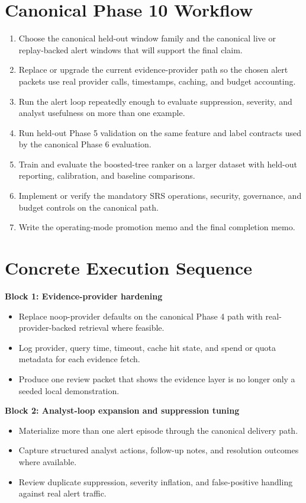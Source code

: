 \documentclass{article}
\begin{document}
\section*{Canonical Phase 10 Workflow}
\begin{enumerate}
\item Choose the canonical held-out window family and the canonical live or replay-backed alert windows that will support the final claim.
\item Replace or upgrade the current evidence-provider path so the chosen alert packets use real provider calls, timestamps, caching, and budget accounting.
\item Run the alert loop repeatedly enough to evaluate suppression, severity, and analyst usefulness on more than one example.
\item Run held-out Phase 5 validation on the same feature and label contracts used by the canonical Phase 6 evaluation.
\item Train and evaluate the boosted-tree ranker on a larger dataset with held-out reporting, calibration, and baseline comparisons.
\item Implement or verify the mandatory SRS operations, security, governance, and budget controls on the canonical path.
\item Write the operating-mode promotion memo and the final completion memo.
\end{enumerate}

\section*{Concrete Execution Sequence}
\textbf{Block 1: Evidence-provider hardening}
\begin{itemize}
\item Replace noop-provider defaults on the canonical Phase 4 path with real-provider-backed retrieval where feasible.
\item Log provider, query time, timeout, cache hit state, and spend or quota metadata for each evidence fetch.
\item Produce one review packet that shows the evidence layer is no longer only a seeded local demonstration.
\end{itemize}

\textbf{Block 2: Analyst-loop expansion and suppression tuning}
\begin{itemize}
\item Materialize more than one alert episode through the canonical delivery path.
\item Capture structured analyst actions, follow-up notes, and resolution outcomes where available.
\item Review duplicate suppression, severity inflation, and false-positive handling against real alert traffic.
\end{itemize}
\end{document}
